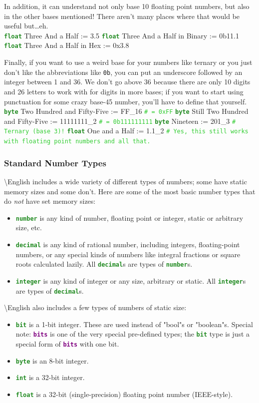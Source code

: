 \documentclass{article}
\newcommand{\English}{\textbackslash{}English}				%
\newcommand{\sssecl}[1]{\subsubsection{#1}\label{sssec:#1}}
\newcommand{\codecomment}[1]{\texttt{\textcolor{LimeGreen}{#1}}}
\newcommand{\commentline}[1]{\codecomment{\# #1}}
\newcommand{\type}[1]{\texttt{\textcolor{ForestGreen}{\textbf{#1}}}}
\newcommand{\keyop}[1]{\texttt{\textcolor{Purple}{\textbf{#1}}}}
\newenvironment{code}[0]
{\ttfamily{}				%
\setlength\parindent{0cm}	%
~\\}
{\setlength\parindent{1cm}
~\\}
\begin{document}
\indent In addition, it can understand not only base 10 floating point numbers, but also in the other bases mentioned! There aren't many places where that would be useful but\ldots eh.
\begin{code}
\type{float} Three And a Half := 3.5
\type{float} Three And a Half in Binary := 0b11.1
\type{float} Three And a Half in Hex := 0x3.8
\end{code}

\indent Finally, if you want to use a weird base for your numbers like ternary or you just don't like the abbreviations like \texttt{0b}, you can put an underscore followed by an integer between 1 and 36. We don't go above 36 because there are only 10 digits and 26 letters to work with for digits in more bases; if you want to start using punctuation for some crazy base-45 number, you'll have to define that yourself.
\begin{code}
\type{byte} Two Hundred and Fifty-Five := FF\_16 \commentline{ = 0xFF}
\type{byte} Still Two Hundred and Fifty-Five := 11111111\_2 \commentline{ = 0b111111111}
\type{byte} Nineteen := 201\_3 \commentline{Ternary (base 3)!}
\type{float} One and a Half := 1.1\_2 \commentline{Yes, this still works with floating point numbers and all that.}
\end{code}

\sssecl{Standard Number Types}
\indent \English{} includes a wide variety of different types of numbers; some have static memory sizes and some don't. Here are some of the most basic number types that do \emph{not} have set memory sizes:
\begin{itemize}
	\item \type{number} is any kind of number, floating point or integer, static or arbitrary size, etc.
	\item \type{decimal} is any kind of rational number, including integers, floating-point numbers, or any special kinds of numbers like integral fractions or square roots calculated lazily. All \type{decimal}s are types of \type{number}s.
	\item \type{integer} is any kind of integer or any size, arbitrary or static. All \type{integer}s are types of \type{decimal}s.
\end{itemize}

\indent \English{} also includes a few types of numbers of static size:
\begin{itemize}
	\item \type{bit} is a 1-bit integer. These are used instead of "bool"s or "boolean"s. Special note: \keyop{bits} is one of the very special pre-defined types; the \type{bit} type is just a special form of \keyop{bits} with one bit.
	\item \type{byte} is an 8-bit integer.
	\item \type{int} is a 32-bit integer.
	\item \type{float} is a 32-bit (single-precision) floating point number (IEEE-style).
\end{itemize}
\end{document}
